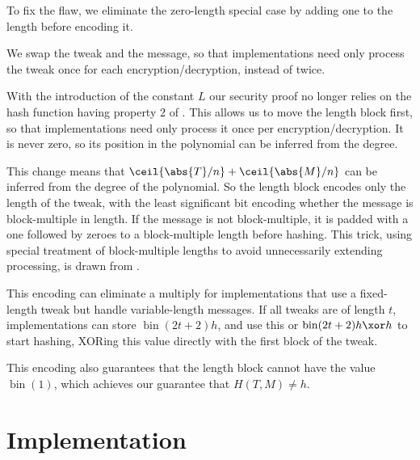 \documentclass[letterpaper,11pt]{article}
\DeclareMathOperator{\fromint}{bin}
\begin{document}
To fix the \cite{kumarhctr} flaw, we eliminate the zero-length special case
by adding one to the length before encoding it.

We swap the tweak and the message, so that implementations need only
process the tweak once for each encryption/decryption, instead of twice.

With the introduction of the constant \(L\)
our security proof no longer relies on the hash function
having property 2 of \cite[Section~3.3]{hctr}.
This allows us to move the length block first, so
that implementations need only process it once per encryption/decryption.
It is never zero, so its position in the
polynomial can be inferred from the degree.

This change means that \(\ceil{\abs{T}/n} + \ceil{\abs{M}/n}\)
can be inferred from the degree of the
polynomial. So the length block encodes
only the length of the tweak, 
with the least significant bit encoding 
whether the message is
block-multiple in length. If the message is not
block-multiple, it is padded with a one followed
by zeroes to a block-multiple length before hashing.
This trick, using special treatment of block-multiple
lengths to avoid unnecessarily extending processing,
is drawn from \cite{xcbc}.

This encoding can eliminate a multiply for implementations that use
a fixed-length tweak but handle variable-length messages.
If all tweaks are of length \(t\), implementations can store
\(\fromint(2t + 2)h\), and use this or \(\fromint(2t + 2)h \xor h\)
to start hashing, XORing this value directly with the
first block of the tweak.

This encoding also guarantees that the length block
cannot have the value \(\fromint(1)\), which achieves
our guarantee that \(H(T, M) \neq h\).


\section{Implementation}

\printbibliography[heading=bibintoc]
\end{document}
